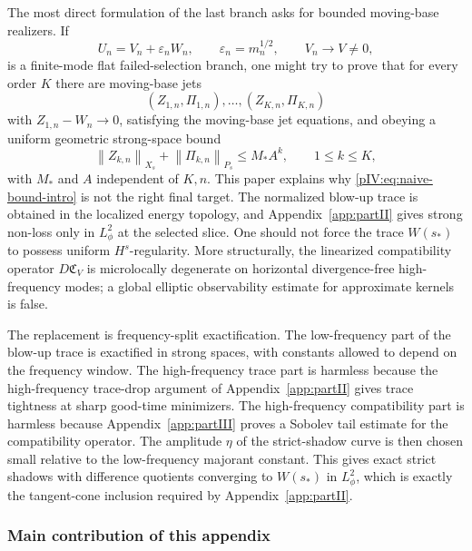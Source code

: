 \documentclass[11pt]{article}
\numberwithin{equation}{section}
\theoremstyle{plain}
\theoremstyle{definition}
\theoremstyle{remark}
\newcommand{\eps}{\varepsilon}
\newcommand{\norm}[2]{\left\|#1\right\|_{#2}}
\newcommand{\calC}{\mathfrak C}
\begin{document}
The most direct formulation of the last branch asks for bounded moving-base
realizers.  If
\[
        U_n=V_n+\eps_n W_n,
        \qquad
        \eps_n=m_n^{1/2},
        \qquad
        V_n\to V\ne0,
\]
is a finite-mode flat failed-selection branch, one might try to prove that for
every order \(K\) there are moving-base jets
\[
        (Z_{1,n},\Pi_{1,n}),\ldots,(Z_{K,n},\Pi_{K,n})
\]
with \(Z_{1,n}-W_n\to0\), satisfying the moving-base jet equations, and obeying a
uniform geometric strong-space bound
\begin{equation}\label{pIV:eq:naive-bound-intro}
        \norm{Z_{k,n}}{X_s}+\norm{\Pi_{k,n}}{P_s}
        \le M_*A^k,
        \qquad 1\le k\le K,
\end{equation}
with \(M_*\) and \(A\) independent of \(K,n\).  This paper explains why
\eqref{pIV:eq:naive-bound-intro} is not the right final target.  The normalized blow-up
trace is obtained in the localized energy topology, and Appendix~\ref{app:partII} gives strong
non-loss only in \(L^2_\phi\) at the selected slice.  One should not force the trace
\(W(s_*)\) to possess uniform \(H^s\)-regularity.  More structurally, the linearized
compatibility operator \(D\calC_V\) is microlocally degenerate on horizontal
divergence-free high-frequency modes; a global elliptic observability estimate for
approximate kernels is false.

The replacement is frequency-split exactification.  The low-frequency part of the
blow-up trace is exactified in strong spaces, with constants allowed to depend on
the frequency window.  The high-frequency trace part is harmless because the
high-frequency trace-drop argument of Appendix~\ref{app:partII} gives trace tightness at sharp
good-time minimizers.  The high-frequency compatibility part is harmless because
Appendix~\ref{app:partIII} proves a Sobolev tail estimate for the compatibility operator.  The
amplitude \(\eta\) of the strict-shadow curve is then chosen small relative to the
low-frequency majorant constant.  This gives exact strict shadows with difference
quotients converging to \(W(s_*)\) in \(L^2_\phi\), which is exactly the tangent-cone
inclusion required by Appendix~\ref{app:partII}.

\subsubsection{Main contribution of this appendix}
\end{document}
